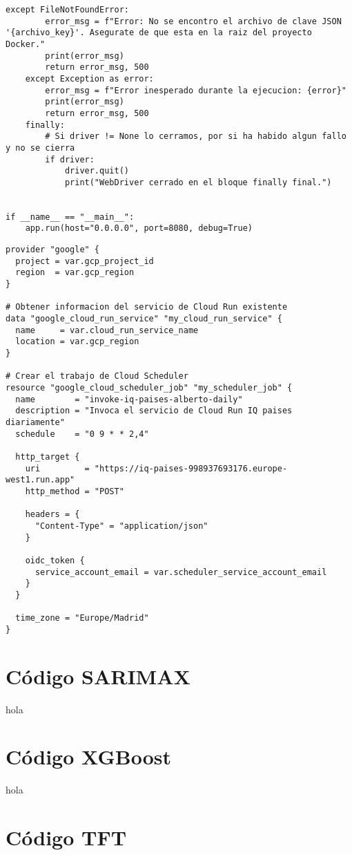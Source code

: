 \begin{lstlisting}[caption = {Código de web scrapping completo.}, label = WBSCode]
    except FileNotFoundError:
        error_msg = f"Error: No se encontro el archivo de clave JSON '{archivo_key}'. Asegurate de que esta en la raiz del proyecto Docker."
        print(error_msg)
        return error_msg, 500
    except Exception as error:
        error_msg = f"Error inesperado durante la ejecucion: {error}"
        print(error_msg)
        return error_msg, 500
    finally:
        # Si driver != None lo cerramos, por si ha habido algun fallo y no se cierra
        if driver:
            driver.quit()
            print("WebDriver cerrado en el bloque finally final.")


if __name__ == "__main__":
    app.run(host="0.0.0.0", port=8080, debug=True)
\end{lstlisting}


\begin{lstlisting}[caption = {Código de Terraform para el Google Scheduler.}, label = TFCode]
provider "google" {
  project = var.gcp_project_id
  region  = var.gcp_region
}

# Obtener informacion del servicio de Cloud Run existente
data "google_cloud_run_service" "my_cloud_run_service" {
  name     = var.cloud_run_service_name
  location = var.gcp_region
}

# Crear el trabajo de Cloud Scheduler
resource "google_cloud_scheduler_job" "my_scheduler_job" {
  name        = "invoke-iq-paises-alberto-daily"
  description = "Invoca el servicio de Cloud Run IQ paises diariamente"
  schedule    = "0 9 * * 2,4"

  http_target {
    uri         = "https://iq-paises-998937693176.europe-west1.run.app"
    http_method = "POST" 

	headers = {
      "Content-Type" = "application/json"
    }

    oidc_token {
      service_account_email = var.scheduler_service_account_email
    }
  }

  time_zone = "Europe/Madrid"
}
\end{lstlisting}
%
%
%
\section{Código SARIMAX}
hola
\section{Código XGBoost}
hola
\section{Código TFT}